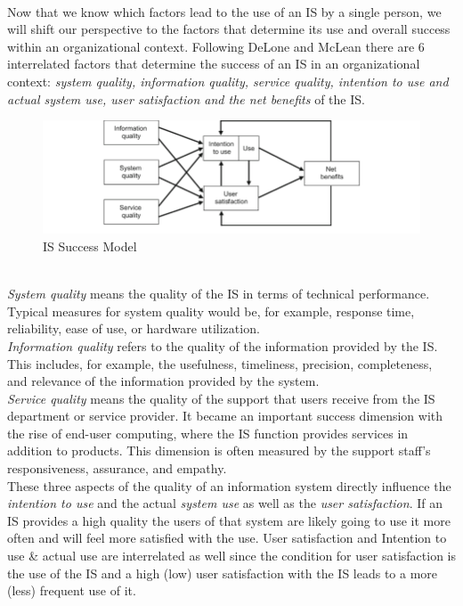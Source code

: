 \documentclass[
	english,
	ruledheaders=section,%
	class=report,%
	thesis={type=bachelor},%
	accentcolor=1b,%
	custommargins=true,%
	marginpar=false,%
	parskip=half-,%
	fontsize=11pt,%
	DIV=14,
]{tudapub}
\begin{document}
\\
Now that we know which factors lead to the use of an IS by a single person, we will shift our perspective to the factors that determine its use and overall success within an organizational context.
Following DeLone and McLean \parencite{DeloneMcLean2003ISSuccessTenYearUpdate} there are 6 interrelated factors that determine the success of an IS in an organizational context: \textit{system quality, information quality, service quality, intention to use and actual system use, user satisfaction and the net benefits} of the IS.\\
\begin{figure}[h!]
    \includegraphics[width=1\linewidth]{images/ISSuccess.png}
    \caption{IS Success Model}
    \label{fig:enter-label}
\end{figure}
\\
\textit{System quality} means the quality of the IS in terms of technical performance. Typical measures for system quality would be, for example, response time, reliability, ease of use, or hardware utilization.\\
\textit{Information quality} refers to the quality of the information provided by the IS. This includes, for example, the usefulness, timeliness, precision, completeness, and relevance of the information provided by the system.\\
\textit{Service quality} means the quality of the support that users receive from the IS department or service provider. It became an important success dimension with the rise of end-user computing, where the IS function provides services in addition to products. This dimension is often measured by the support staff's responsiveness, assurance, and empathy.
\\
These three aspects of the quality of an information system directly influence the \textit{intention to use} and the actual \textit{system use} as well as the \textit{user satisfaction}. If an IS provides a high quality the users of that system are likely going to use it more often and will feel more satisfied with the use. User satisfaction and Intention to use \& actual use are interrelated as well since the condition for user satisfaction is the use of the IS and a high (low) user satisfaction with the IS leads to a more (less) frequent use of it.\\
\end{document}
